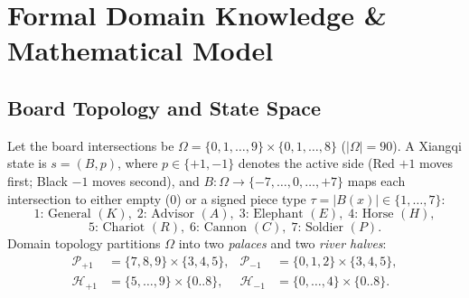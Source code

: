 \documentclass[conference]{IEEEtran}
\begin{document}
\section{Formal Domain Knowledge \& Mathematical Model}
\subsection{Board Topology and State Space}
Let the board intersections be $\Omega = \{0,1,\dots,9\} \times \{0,1,\dots,8\}$ ($|\Omega|=90$). A Xiangqi state is $s = (B, p)$, where $p \in \{+1, -1\}$ denotes the active side (Red $+1$ moves first; Black $-1$ moves second), and $B: \Omega \to \{-7,\dots,0,\dots,+7\}$ maps each intersection to either empty ($0$) or a signed piece type $\tau = |B(x)| \in \{1,\dots,7\}$:
\[
1{:}\,\text{General }(K),\; 2{:}\,\text{Advisor }(A),\; 3{:}\,\text{Elephant }(E),\; 4{:}\,\text{Horse }(H),
\]
\[
5{:}\,\text{Chariot }(R),\; 6{:}\,\text{Cannon }(C),\; 7{:}\,\text{Soldier }(P).
\]
Domain topology partitions $\Omega$ into two \emph{palaces} and two \emph{river halves}:
\begin{align}
\mathcal{P}_{+1} &= \{7,8,9\}\times\{3,4,5\}, & \mathcal{P}_{-1} &= \{0,1,2\}\times\{3,4,5\}, \\
\mathcal{H}_{+1} &= \{5,\dots,9\}\times\{0..8\}, & \mathcal{H}_{-1} &= \{0,\dots,4\}\times\{0..8\}.
\end{align}
\end{document}
